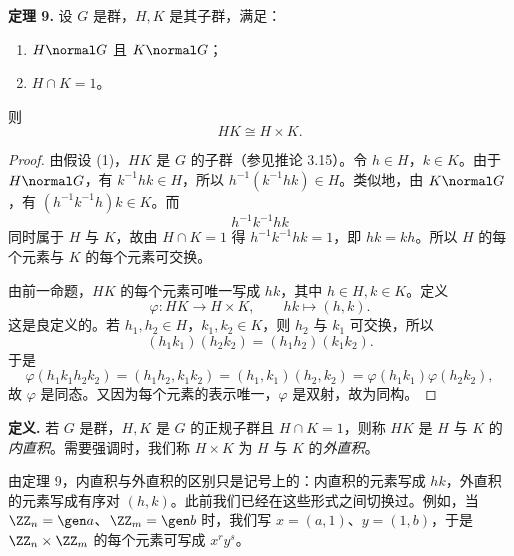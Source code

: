 \medskip
\noindent\textbf{定理 9.} 设 $G$ 是群，$H,K$ 是其子群，满足：
\begin{enumerate}[label=(\arabic*)]
  \item $H\normal G$ 且 $K\normal G$；
  \item $H\cap K=1$。
\end{enumerate}
则
\[
  HK\cong H\times K.
\]

\begin{proof}
由假设 (1)，$HK$ 是 $G$ 的子群（参见推论 3.15）。令 $h\in H$，$k\in K$。由于 $H\normal G$，有 $k^{-1}hk\in H$，所以 $h^{-1}(k^{-1}hk)\in H$。类似地，由 $K\normal G$，有 $(h^{-1}k^{-1}h)k\in K$。而
\[
  h^{-1}k^{-1}hk
\]
同时属于 $H$ 与 $K$，故由 $H\cap K=1$ 得 $h^{-1}k^{-1}hk=1$，即 $hk=kh$。所以 $H$ 的每个元素与 $K$ 的每个元素可交换。

由前一命题，$HK$ 的每个元素可唯一写成 $hk$，其中 $h\in H,k\in K$。定义
\[
  \varphi:HK\to H\times K,
\qquad hk\mapsto(h,k).
\]
这是良定义的。若 $h_1,h_2\in H$，$k_1,k_2\in K$，则 $h_2$ 与 $k_1$ 可交换，所以
\[
  (h_1k_1)(h_2k_2)=(h_1h_2)(k_1k_2).
\]
于是
\[
\varphi(h_1k_1h_2k_2)=(h_1h_2,k_1k_2)=(h_1,k_1)(h_2,k_2)=\varphi(h_1k_1)\varphi(h_2k_2),
\]
故 $\varphi$ 是同态。又因为每个元素的表示唯一，$\varphi$ 是双射，故为同构。
\end{proof}

\noindent\textbf{定义.} 若 $G$ 是群，$H,K$ 是 $G$ 的正规子群且 $H\cap K=1$，则称 $HK$ 是 $H$ 与 $K$ 的\emph{内直积}。需要强调时，我们称 $H\times K$ 为 $H$ 与 $K$ 的\emph{外直积}。

由定理 9，内直积与外直积的区别只是记号上的：内直积的元素写成 $hk$，外直积的元素写成有序对 $(h,k)$。此前我们已经在这些形式之间切换过。例如，当 $\ZZ_n=\gen a$、$\ZZ_m=\gen b$ 时，我们写 $x=(a,1)$、$y=(1,b)$，于是 $\ZZ_n\times\ZZ_m$ 的每个元素可写成 $x^ry^s$。

